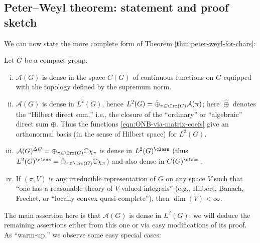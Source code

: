 \documentclass[reqno]{amsart} 
\begin{document}
\subsection{Peter--Weyl theorem: statement and proof sketch}\label{sec:peter-weyl-theorem}
We can now state the more complete form of Theorem \ref{thm:peter-weyl-for-chars}:
\begin{theorem}\label{thm:P-W-general}
  Let $G$ be a compact group.
  \begin{enumerate}
[(i)]
  \item $\mathcal{A}(G)$ is dense in the space $C(G)$ of continuous functions on $G$ equipped with the topology defined by the supremum norm.
  \item $\mathcal{A}(G)$ is dense in $L^2(G)$, hence $L^2(G) = \hat{\oplus}_{\pi \in \Irr(G)} \mathcal{A}(\pi)$; here $\hat{\oplus}$ denotes the ``Hilbert direct sum,'' i.e., the closure of the ``ordinary'' or ``algebraic'' direct sum $\oplus$.  Thus the functions \eqref{eqn:ONB-via-matrix-coefs} give an orthonormal basis (in the sense of Hilbert space) for $L^2(G)$.
  \item $\mathcal{A}(G)^{\Delta G} = \oplus_{\pi \in \Irr(G)} \mathbb{C} \chi_\pi$ is dense in $L^2(G)^{\class}$ (thus $L^2(G)^{\class} = \hat{\oplus}_{\pi \in \Irr(G)} \mathbb{C} \chi_\pi$) and also dense in $C(G)^{\class}$.
  \item If $(\pi,V)$ is any irreducible representation of $G$ on any space $V$ such that ``one has a reasonable theory of $V$-valued integrals'' (e.g., Hilbert, Banach, Frechet, or ``locally convex quasi-complete''), then $\dim(V) < \infty$.
  \end{enumerate}
\end{theorem}
The main assertion here is that $\mathcal{A}(G)$ is dense in $L^2(G)$; we will deduce the remaining assertions either from this one or via easy modifications of its proof.  As ``warm-up,'' we observe some easy special cases:
\end{document}
